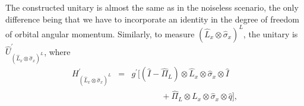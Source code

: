 \documentclass[aps,pra,showpacs,twoside,twocolumn,10pt]{revtex4-1}
\newcommand{\stkout}[1]{\ifmmode\text{\sout{\ensuremath{#1}}}\else\sout{#1}\fi}
\begin{document}
The constructed unitary is almost the same as in the noiseless scenario,
the only difference being that we have to incorporate an identity in the degree of freedom of orbital angular momentum. %
Similarly, to measure $(\hat{L}_x\otimes \hat{\sigma}_x)^L$, the unitary is $\hat{U}_{(\hat{L}_x\otimes \hat{\sigma}_x)^L}^{\prime}$, where
\begin{eqnarray}
     H_{(\hat{L}_x\otimes \hat{\sigma}_x)^L}^{\prime} &=& g^{\prime}[(\hat{I}-\hat{\Pi}_L) \otimes \hat{L}_x \otimes \hat{\sigma}_x \otimes \hat{I}\nonumber\\
     &&\phantom{jodi tare}+ \hat{\Pi}_L \otimes \hat{L}_x\otimes\hat{\sigma}_x \otimes \hat{q}],
     \label{eq:H_last}
\end{eqnarray}
\end{document}
